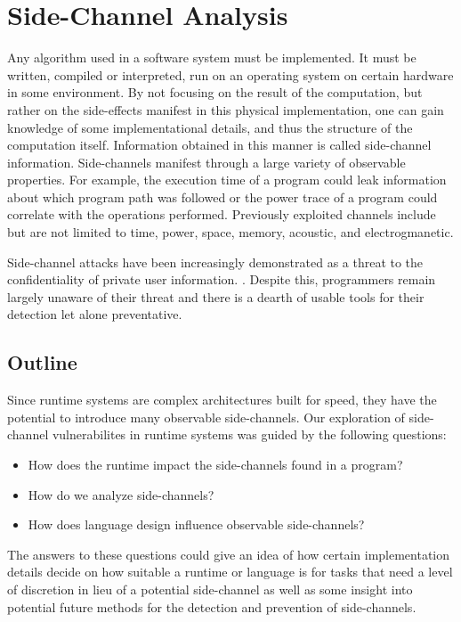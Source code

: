 \section{Side-Channel Analysis}

Any algorithm used in a software system must be implemented. It must be written, compiled or interpreted, run on an operating system on certain hardware in some environment. 
By not focusing on the result of the computation, but rather on the side-effects
manifest in this physical implementation, one can gain knowledge of some
implementational details, and thus the structure of the computation itself. Information obtained in this manner is called side-channel information. Side-channels manifest through a large variety of observable properties. For example, the execution time of a program could leak information about which program path was followed or the power trace of a program could correlate with the operations performed. Previously exploited channels include but are not limited to time, power, space, memory, acoustic, and electrogmanetic. 

Side-channel attacks have been increasingly demonstrated as a threat to the confidentiality of private user information. \cite{brumley2005remote, brumley2011remote, hund2013practical, mangard2008power,messerges2000using}. Despite this, programmers remain largely unaware of their threat and there is a dearth of usable tools for their detection let alone preventative. 


\subsection{Outline}
Since runtime systems are complex architectures built for speed, they have the potential to introduce many observable side-channels. Our exploration of side-channel vulnerabilites in runtime systems was guided by the following questions:
\begin{itemize}     
	\item{How does the runtime impact the side-channels found in a program?}
	\item{How do we analyze side-channels?}
	\item{How does language design influence observable side-channels?}
\end{itemize}

The answers to these questions could give an idea of how certain implementation
details decide on how suitable a runtime or language is for tasks that need a level
of discretion in lieu of a potential side-channel as well as some insight into potential future methods for the detection and prevention of side-channels. 